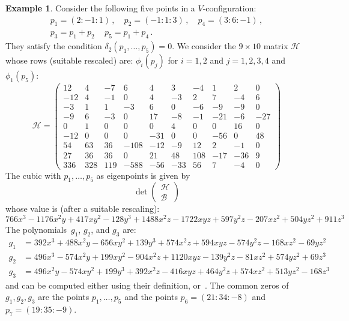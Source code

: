 \documentclass{amsart}
\theoremstyle{plain}
\theoremstyle{definition}
\newtheorem{es}[lemma]{Example}
\begin{document}
\begin{es}
Consider the following five points in a $V$-configuration:
%
\begin{gather*}
  p_1 = (2: -1: 1) \,, \quad p_2 = (-1: 1: 3) \,, \quad p_4 = (3: 6: -1) \,, \\
  p_3 = p_1+p_2 \, \quad p_5 = p_1+p_4 \,.
\end{gather*}
%
They satisfy the condition $\delta_2(p_1, \dots, p_5) = 0$.
We consider the $9\times 10$ matrix $\mathcal{H}$ whose rows
(suitable rescaled) are:
$\phi_i(p_j)$ for $i = 1, 2$ and $j = 1, 2, 3, 4$ and $\phi_1(p_5)$:
%
\[
  \mathcal{H} =
  \left(
  \begin{array}{rrrrrrrrrr}
    12 & 4 & -7 & 6 & 4 & 3 & -4 & 1 & 2 & 0 \\
    -12 & 4 & -1 & 0 & 4 & -3 & 2 & 7 & -4 & 6 \\
    -3 & 1 & 1 & -3 & 6 & 0 & -6 & -9 & -9 & 0 \\
    -9 & 6 & -3 & 0 & 17 & -8 & -1 & -21 & -6 & -27 \\
    0 & 1 & 0 & 0 & 0 & 4 & 0 & 0 & 16 & 0 \\
    -12 & 0 & 0 & 0 & -31 & 0 & 0 & -56 & 0 & 48 \\
    54 & 63 & 36 & -108 & -12 & -9 & 12 & 2 & -1 & 0\\
    27 & 36 & 36 & 0 & 21 & 48 & 108 & -17 & -36 & 9 \\
    336 & 328 & 119 & -588 & -56 & -33 & 56 & 7 & -4 & 0
  \end{array}
  \right)
\]
%
The cubic with $p_1, \dots, p_5$ as eigenpoints is given by
%
\[
  \det \left(
  \begin{array}{c}
    \mathcal{H}\\
    \mathcal{B}
  \end{array}
  \right)
\]
%
whose value is (after a suitable rescaling):
%
\[
  766x^3 - 1176x^2y + 417xy^2 - 128y^3 + 1488x^2z - 1722xyz
  + 597y^2z - 207xz^2 + 504yz^2 + 911z^3
\]
%
The polynomials~$g_1$, $g_2$, and $g_3$ are:
%
\begin{align*}
  g_1 &= 392x^3 + 488x^2y - 656xy^2 + 139y^3 + 574x^2z + 594xyz - 574y^2z - 168xz^2 - 69yz^2 \\
  g_2 &= 496x^3 - 574x^2y + 199xy^2 - 904x^2z + 1120xyz - 139y^2z - 81xz^2 + 574yz^2 + 69z^3 \\
  g_3 &= 496x^2y - 574xy^2 + 199y^3 + 392x^2z - 416xyz + 464y^2z + 574xz^2 + 513yz^2 - 168z^3
\end{align*}
%
and can be computed either using their definition,
or~.
The common zeros of $g_1, g_2, g_3$ are the points $p_1, \dots, p_5$
and the points $p_6 = (21: 34: -8)$ and $p_7 = (19: 35: -9)$.
\end{es}
\end{document}
